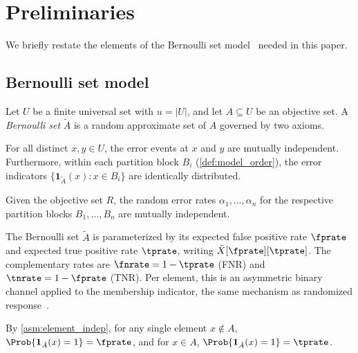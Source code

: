 
\section{Preliminaries}
\label{sec:preliminaries}

We briefly restate the elements of the Bernoulli set model~\cite{bernoulliSets} needed in this paper.

\subsection{Bernoulli set model}

Let $U$ be a finite universal set with $u = |U|$, and let $A \subseteq U$ be an objective set.
A \emph{Bernoulli set} $\tilde{A}$ is a random approximate set of $A$ governed by two axioms.

\begin{axiom}
\label{asm:element_indep}
For all distinct $x, y \in U$, the error events at $x$ and $y$ are mutually independent.
Furthermore, within each partition block $B_i$ (\cref{def:model_order}), the error indicators $\{\mathbf{1}_{\tilde{A}}(x) : x \in B_i\}$ are identically distributed.
\end{axiom}

\begin{axiom}
\label{asm:fpr_fnr_r_indep}
Given the objective set $R$, the random error rates $\alpha_1, \ldots, \alpha_n$ for the respective partition blocks $B_1, \ldots, B_n$ are mutually independent.
\end{axiom}

The Bernoulli set $\tilde{A}$ is parameterized by its expected false positive rate $\fprate$ and expected true positive rate $\tprate$, writing $\tilde{X}[\fprate][\tprate]$.
The complementary rates are $\fnrate = 1 - \tprate$ (FNR) and $\tnrate = 1 - \fprate$ (TNR).
Per element, this is an asymmetric binary channel applied to the membership indicator, the same mechanism as randomized response~\cite{warner1965randomized}.

\begin{proposition}
\label{prop:element_rates}
By \cref{asm:element_indep}, for any single element $x \notin A$,
$\Prob{\mathbf{1}_{\tilde{A}}(x) = 1} = \fprate$, and for $x \in A$,
$\Prob{\mathbf{1}_{\tilde{A}}(x) = 1} = \tprate$.
\end{proposition}

